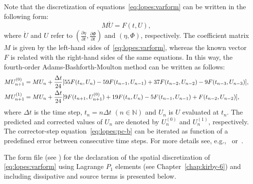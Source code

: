 Note that the discretization of equations~\eqref{eq:lopes:varform} can
be written in the following form:
\begin{equation}
  M\dot U=F(t,U),
\end{equation}
where $\dot U$ and $U$ refer to $\displaystyle \left(\frac{\partial
\eta}{\partial t},\frac{\partial \Phi}{\partial t}\right)$ and
$(\eta,\Phi)$, respectively.  The coefficient matrix $M$ is given by
the left-hand sides of~\eqref{eq:lopes:varform}, whereas the known
vector $F$ is related with the right-hand sides of the same equations.
In this way, the fourth-order Adams-Bashforth-Moulton method can be
written as follows:
\begin{subequations}
  \label{eq:lopes:pc}
  \begin{align}
    &\displaystyle MU^{(0)}_{n+1} = MU_n+\frac{\Delta
      t}{24}[55{F}(t_n,U_n) - 59{F}(t_{n-1},U_{n-1}) +
    37{F}(t_{n-2},U_{n-2})-9{F}(t_{n-3},U_{n-3})],
    \label{eq:lopes:pc-a}\\
    \displaystyle
    &MU^{(1)}_{n+1}=MU_n+\frac{\Delta
      t}{24}[9{F}(t_{n+1},U^{(0)}_{n+1}) + 19{F}(t_n,U_n)-
    5{F}(t_{n-1},U_{n-1}) + {F}(t_{n-2},U_{n-2})],
    \label{eq:lopes:pc-b}
  \end{align}
\end{subequations}
where $\Delta t$ is the time step, $t_n=n\Delta t$ $(n\in \mathbb{N})$
and $U_n$ is $U$ evaluated at $t_n$.  The predicted and corrected
values of $U_n$ are denoted by $U_n^{(0)}$ and $U_n^{(1)}$,
respectively.  The corrector-step equation~\eqref{eq:lopes:pc-b} can
be iterated as function of a predefined error between consecutive time
steps.  For more details see, e.g.,~\citet{HairerWanner1991a}
or~\citet{Lambert1991}.

The \ufl form file (see ) for the
declaration of the spatial discretization of \eqref{eq:lopes:varform}
using Lagrange $P_1$ elements (see Chapter~\ref{chap:kirby-6}) and
including dissipative and source terms is presented below.

